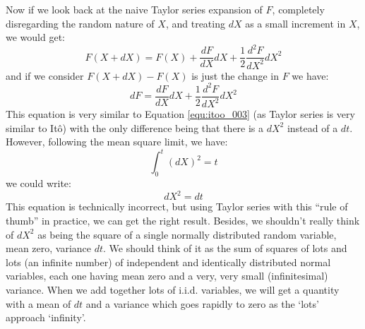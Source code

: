 Now if we look back at the naive Taylor series expansion of $F$, completely disregarding the random nature of $X$, and treating $dX$ as a small increment in $X$, we would get:
\begin{equation}
    F(X+dX) = F(X) + \frac{dF}{dX}dX + \frac{1}{2} \frac{d^2F}{dX^2}dX^2
\end{equation}
and if we consider $F(X+dX) - F(X)$ is just the change in $F$ we have:
\begin{equation}
    dF = \frac{dF}{dX}dX + \frac{1}{2} \frac{d^2F}{dX^2}dX^2
\end{equation}
This equation is very similar to Equation \ref{equ:itoo_003} (as Taylor series is very similar to Itô) with the only difference being that there is a $dX^2$ instead of a $dt$. However, following the mean square limit, we have:
\begin{equation}
    \int_0^t (dX)^2 = t
\end{equation}
we could write:
\begin{equation}
    dX^2 = dt
\end{equation}
This equation is technically incorrect, but using Taylor series with this ``rule of thumb'' in practice, we can get the right result. Besides, we shouldn't really think of $dX^2$ as being the square of a single normally distributed random variable, mean zero, variance $dt$. We should think of it as the sum of squares of lots and lots (an infinite number) of independent and identically distributed normal variables, each one having
mean zero and a very, very small (infinitesimal) variance. When we add together lots of i.i.d. variables, we will get a quantity with a mean of $dt$ and a variance which goes rapidly to zero as the `lots' approach `infinity'. 

\begin{center}
\begin{footnotesize}
\end{footnotesize}
\end{center}

